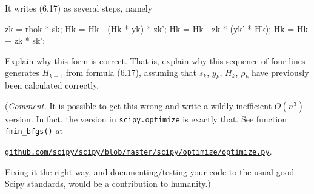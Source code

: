\documentclass[12pt]{amsart}
\begin{document}
It writes (6.17) as several steps, namely
\begin{mVerb}
    zk = rhok * sk;
    Hk = Hk - (Hk * yk) * zk';
    Hk = Hk - zk * (yk' * Hk);
    Hk = Hk + zk * sk';
\end{mVerb}
Explain why this form is correct.  That is, explain why this sequence of four lines generates $H_{k+1}$ from formula (6.17), assuming that $s_k$, $y_k$, $H_k$, $\rho_k$ have previously been calculated correctly.

\bigskip

\noindent \scriptsize (\emph{Comment.}  It is possible to get this wrong and write a wildly-inefficient $O(n^3)$ version.  In fact, the version in \texttt{scipy.optimize} is exactly that.  See function \verb|fmin_bfgs()| at

\href{https://github.com/scipy/scipy/blob/master/scipy/optimize/optimize.py}{\texttt{github.com/scipy/scipy/blob/master/scipy/optimize/optimize.py}}.

\noindent Fixing it the right way, and documenting/testing your code to the usual good Scipy standards, would be a contribution to humanity.)
\end{document}
